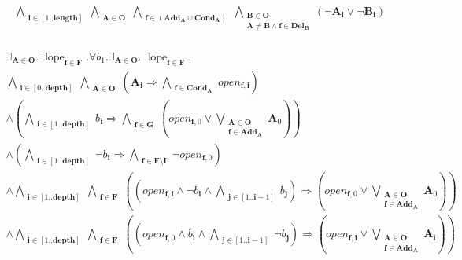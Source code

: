 \documentclass[fleqn]{article}
\begin{document}
\begin{multline*}
\bigwedge\limits_{\substack{\mathbf{i}\in [1..\mathbf{length}]}}\bigwedge\limits_{\substack{\mathbf{A}\in \mathbf{O}}}\bigwedge\limits_{\substack{\mathbf{f}\in \left(\mathbf{Add}_{\mathbf{A}}\cup\mathbf{Cond}_{\mathbf{A}}\right)}}\bigwedge\limits_{\substack{\mathbf{B}\in \mathbf{O}\\\mathbf{A} \neq \mathbf{B} \wedge \mathbf{f} \in \mathbf{Del}_{\mathbf{B}}}}\left(\neg \mathbf{A}_{\mathbf{i}} \vee \neg \mathbf{B}_{\mathbf{i}}\right)\\
\end{multline*}

\begin{multline*}
\displaystyle\mathop{\exists \mathbf{A}_{1}}_{\mathbf{A}\in \mathbf{O}} .\displaystyle\mathop{\exists open_{\mathbf{f},1}}_{\mathbf{f}\in \mathbf{F}} .\forall b_{1}. \displaystyle\mathop{\exists \mathbf{A}_{0}}_{\mathbf{A}\in \mathbf{O}} .\displaystyle\mathop{\exists open_{\mathbf{f},0}}_{\mathbf{f}\in \mathbf{F}} .\\
\bigwedge\limits_{\substack{\mathbf{i}\in [0..\mathbf{depth}]}}\bigwedge\limits_{\substack{\mathbf{A}\in \mathbf{O}}}\left(\mathbf{A}_{\mathbf{i}} \Rightarrow \bigwedge\limits_{\substack{\mathbf{f}\in \mathbf{Cond}_{\mathbf{A}}}}open_{\mathbf{f},\mathbf{i}}\right)\\
 \wedge \left(\bigwedge\limits_{\substack{\mathbf{i}\in [1..\mathbf{depth}]}}b_{\mathbf{i}} \Rightarrow \bigwedge\limits_{\substack{\mathbf{f}\in \mathbf{G}}}\left(open_{\mathbf{f},0} \vee \bigvee\limits_{\substack{\mathbf{A}\in \mathbf{O}\\\mathbf{f} \in \mathbf{Add}_{\mathbf{A}}}}\mathbf{A}_{0}\right)\right)\\
 \wedge \left(\bigwedge\limits_{\substack{\mathbf{i}\in [1..\mathbf{depth}]}}\neg b_{\mathbf{i}} \Rightarrow \bigwedge\limits_{\substack{\mathbf{f}\in \mathbf{F}\setminus \mathbf{I}}}\neg open_{\mathbf{f},0}\right)\\
 \wedge \bigwedge\limits_{\substack{\mathbf{i}\in [1..\mathbf{depth}]}}\bigwedge\limits_{\substack{\mathbf{f}\in \mathbf{F}}}\left(\left(open_{\mathbf{f},\mathbf{i}} \wedge \neg b_{\mathbf{i}} \wedge \bigwedge\limits_{\substack{\mathbf{j}\in [1..\mathbf{i} - 1]}}b_{\mathbf{j}}\right) \Rightarrow \left(open_{\mathbf{f},0} \vee \bigvee\limits_{\substack{\mathbf{A}\in \mathbf{O}\\\mathbf{f} \in \mathbf{Add}_{\mathbf{A}}}}\mathbf{A}_{0}\right)\right)\\
 \wedge \bigwedge\limits_{\substack{\mathbf{i}\in [1..\mathbf{depth}]}}\bigwedge\limits_{\substack{\mathbf{f}\in \mathbf{F}}}\left(\left(open_{\mathbf{f},0} \wedge b_{\mathbf{i}} \wedge \bigwedge\limits_{\substack{\mathbf{j}\in [1..\mathbf{i} - 1]}}\neg b_{\mathbf{j}}\right) \Rightarrow \left(open_{\mathbf{f},\mathbf{i}} \vee \bigvee\limits_{\substack{\mathbf{A}\in \mathbf{O}\\\mathbf{f} \in \mathbf{Add}_{\mathbf{A}}}}\mathbf{A}_{\mathbf{i}}\right)\right)\\

\end{multline*}
\end{document}

